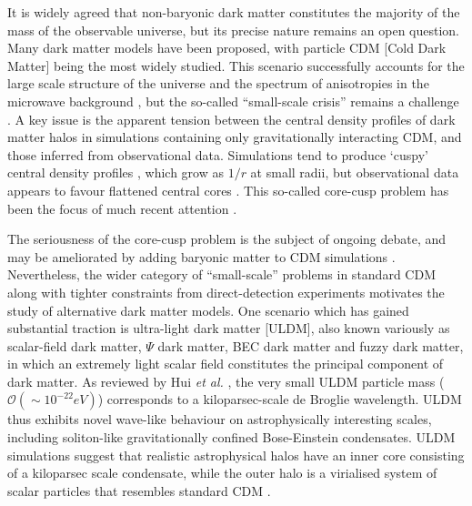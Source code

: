 \documentclass{pasa}%
\begin{document}
It is widely agreed that non-baryonic dark matter constitutes the majority of the mass of the observable universe, but its precise nature remains an open question. Many dark matter models have been proposed, with particle CDM [Cold Dark Matter]  being the most widely studied. This scenario successfully accounts for the large scale structure of the universe \cite{Springel:2005nw} and the spectrum of anisotropies in the microwave background \cite{deBernardis:2000sbo, Hanany:2000qf, Halverson:2001yy, Netterfield:2001yq, Lee:2001yp, Ade:2015xua,  Hu:2001bc}, but the so-called ``small-scale crisis''  remains a challenge \cite{Weinberg:2013aya}. A key issue is the apparent tension between the  central density profiles of dark matter halos in simulations containing only gravitationally interacting CDM, and those inferred from observational data. Simulations tend to produce `cuspy' central density profiles \cite{Navarro:1995iw}, which grow as $1/r$ at small radii, but observational data appears to favour flattened central cores \cite{Moore:1994yx}. This so-called core-cusp problem has been the focus of much recent attention \cite{Dutton:2018nop, Read:2018pft, Genina:2018}. 
 
The seriousness of the core-cusp problem is the subject of ongoing debate, and may be ameliorated by adding baryonic matter to CDM simulations \cite{Benitez-Llambay:2018}. Nevertheless, the wider category of  ``small-scale'' problems in standard CDM along with tighter constraints from direct-detection experiments \cite{Schumann:2019eaa} motivates the study of alternative dark matter models. One scenario which has gained substantial traction is ultra-light dark matter [ULDM], also known variously as scalar-field dark matter, $\Psi$ dark matter, BEC dark matter and fuzzy dark matter, in which an extremely light scalar field constitutes the principal component of dark matter.  As reviewed by Hui {\em et al.\/} \cite{Hui:2016ltb}, the very small ULDM particle mass ($\mathcal{O}(\sim 10^{-22}eV)$) corresponds to a kiloparsec-scale de Broglie wavelength. ULDM thus exhibits novel wave-like behaviour on astrophysically interesting scales, including soliton-like gravitationally confined Bose-Einstein condensates. ULDM simulations suggest that realistic astrophysical halos have an inner core consisting of a kiloparsec scale condensate, while the outer halo is a virialised system of scalar particles that resembles standard CDM \cite{Schwabe:2016rze, Veltmaat:2018dfz}. 
\end{document}
